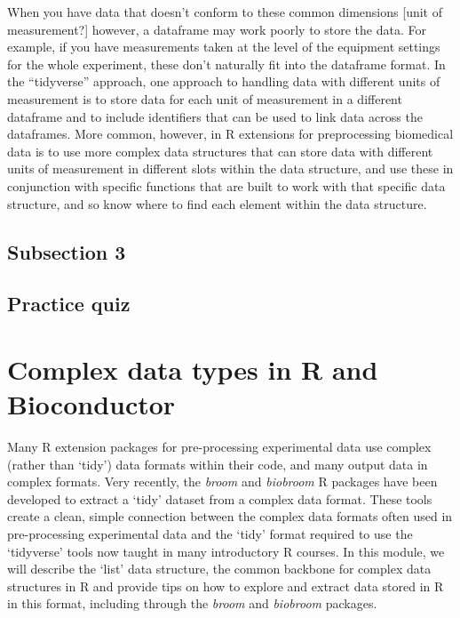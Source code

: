 \documentclass[]{tufte-book}
\begin{document}
When you have data that doesn't conform to these common dimensions {[}unit of
measurement?{]} however, a dataframe may work poorly to store the data. For
example, if you have measurements taken at the level of the equipment settings
for the whole experiment, these don't naturally fit into the dataframe format.
In the ``tidyverse'' approach, one approach to handling data with different units
of measurement is to store data for each unit of measurement in a different
dataframe and to include identifiers that can be used to link data across the
dataframes. More common, however, in R extensions for preprocessing biomedical
data is to use more complex data structures that can store data with different
units of measurement in different slots within the data structure, and use these
in conjunction with specific functions that are built to work with that specific
data structure, and so know where to find each element within the data
structure.

\hypertarget{subsection-3}{%
\subsection{Subsection 3}\label{subsection-3}}

\hypertarget{practice-quiz}{%
\subsection{Practice quiz}\label{practice-quiz}}

\hypertarget{complex-data-types-in-r-and-bioconductor}{%
\section{Complex data types in R and Bioconductor}\label{complex-data-types-in-r-and-bioconductor}}

Many R extension packages for pre-processing experimental data use complex
(rather than `tidy') data formats within their code, and many output data in
complex formats. Very recently, the \emph{broom} and \emph{biobroom} R
packages have been developed to extract a `tidy' dataset from a complex data
format. These tools create a clean, simple connection between the complex data
formats often used in pre-processing experimental data and the `tidy' format
required to use the `tidyverse' tools now taught in many introductory R courses.
In this module, we will describe the `list' data structure, the common backbone
for complex data structures in R and provide tips on how to explore and extract
data stored in R in this format, including through the \emph{broom} and
\emph{biobroom} packages.
\end{document}
